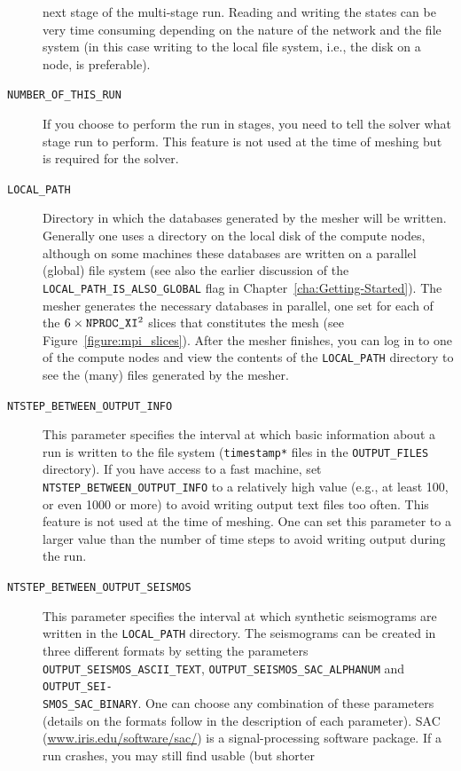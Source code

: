 \documentclass[oneside,english]{book}
\newcommand{\urlwithparentheses}[1]{(\url{#1})}
\newcommand{\nprocxi}{\mbox{\texttt{NPROC\_XI}}}
\begin{document}
\begin{description}
next stage of the multi-stage run. Reading and writing the states
can be very time consuming depending on the nature of the network
and the file system (in this case writing to the local file system,
i.e., the disk on a node, is preferable).
\item [{\texttt{NUMBER\_OF\_THIS\_RUN}}] If you choose to perform the run
in stages, you need to tell the solver what stage run to perform.
This feature is not used at the time of meshing but is required for
the solver.
\item [{\texttt{LOCAL\_PATH}}] Directory in which the databases generated
by the mesher will be written. Generally one uses a directory on the
local disk of the compute nodes, although on some machines these databases
are written on a parallel (global) file system (see also the earlier
discussion of the \texttt{LOCAL\_PATH\_IS\_ALSO\_GLOBAL} flag in Chapter~\ref{cha:Getting-Started}).
The mesher generates the necessary databases in parallel, one set
for each of the $6\times\nprocxi^{2}$ slices that constitutes the
mesh (see Figure~\ref{figure:mpi_slices}). After the mesher finishes,
you can log in to one of the compute nodes and view the contents of
the \texttt{LOCAL\_PATH} directory to see the (many) files generated
by the mesher.
\item [{\texttt{NTSTEP\_BETWEEN\_OUTPUT\_INFO}}] This parameter specifies
the interval at which basic information about a run is written to
the file system (\texttt{timestamp{*}} files in the \texttt{OUTPUT\_FILES}
directory). If you have access to a fast machine, set \texttt{NTSTEP\_BETWEEN\_OUTPUT\_INFO}
to a relatively high value (e.g., at least 100, or even 1000 or more)
to avoid writing output text files too often. This feature is not
used at the time of meshing. One can set this parameter to a larger
value than the number of time steps to avoid writing output during
the run.
\item [{\texttt{NTSTEP\_BETWEEN\_OUTPUT\_SEISMOS}}] This parameter specifies
the interval at which synthetic seismograms are written in the \texttt{LOCAL\_PATH}
directory. The seismograms can be created in three different formats
by setting the parameters \texttt{OUTPUT\_SEISMOS\_ASCII\_TEXT}, \texttt{OUTPUT\_SEISMOS\_SAC\_ALPHANUM}
and \texttt{OUTPUT\_SEI-}~\\
\texttt{SMOS\_SAC\_BINARY}. One can choose any combination of these
parameters (details on the formats follow in the description of each
parameter). SAC \urlwithparentheses{www.iris.edu/software/sac/} is a signal-processing software
package. If a run crashes, you may still find usable (but shorter

\end{description}
\end{document}
